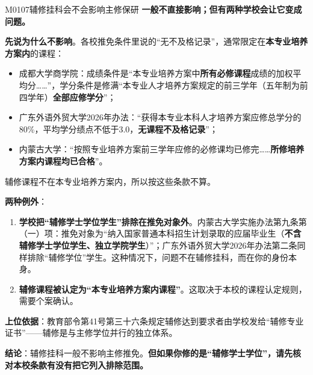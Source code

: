 \begin{qa}{M0107}{辅修挂科会不会影响主修保研}
\textbf{一般不直接影响；但有两种学校会让它变成问题。}

\textbf{先说为什么不影响}。各校推免条件里说的“无不及格记录”，通常限定在\textbf{本专业培养方案内}的课程：
\begin{itemize}
  \item 成都大学商学院：成绩条件是“本专业培养方案中\textbf{所有必修课程}成绩的加权平均分……”，学分条件是修满“本专业人才培养方案规定的前三学年（五年制为前四学年）\textbf{全部应修学分}”；
  \item 广东外语外贸大学2026年办法：“获得本专业本科人才培养方案应修总学分的80\%，平均学分绩点不低于3.0，\textbf{无课程不及格记录}”；
  \item 内蒙古大学：“按照专业培养方案前三学年应修的必修课均已修完……\textbf{所修培养方案内课程均已合格}”。
\end{itemize}

辅修课程不在本专业培养方案内，所以按这些条款不算。

\textbf{两种例外}：

\begin{enumerate}
  \item \textbf{学校把“辅修学士学位学生”排除在推免对象外}。内蒙古大学实施办法第九条第（一）项：推免对象为“纳入国家普通本科招生计划录取的应届毕业生（\textbf{不含辅修学士学位学生、独立学院学生}）”；广东外语外贸大学2026年办法第二条同样排除“辅修学位”学生。这种情况下，问题不在辅修挂科，而在你的身份本身。
  \item \textbf{辅修课程被认定为“本专业培养方案内课程”}。这取决于本校的课程认定规则，需要个案确认。
\end{enumerate}

\textbf{上位依据}：教育部令第41号第三十六条规定辅修达到要求者由学校发给“辅修专业证书”——辅修是与主修学位并行的独立体系。

\textbf{结论}：辅修挂科一般不影响主修推免。\textbf{但如果你修的是“辅修学士学位”，请先核对本校条款有没有把它列入排除范围。}
\end{qa}

